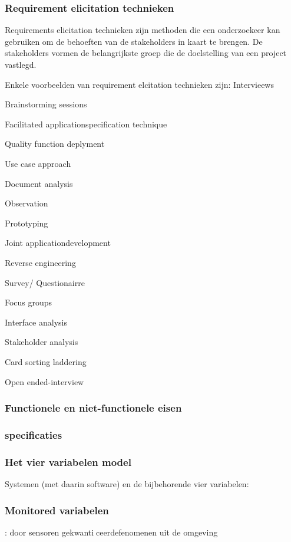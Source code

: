 \subsubsection{Requirement elicitation technieken}

Requirements elicitation technieken zijn methoden die een onderzoekeer kan gebruiken om de behoeften van de stakeholders in kaart te brengen. De stakeholders  vormen de belangrijkste groep die de doelstelling van een project vastlegd.

Enkele voorbeelden van requirement elcitation technieken zijn:
Intervieews 

Brainstorming sessions 

Facilitated applicationspecification technique 

Quality function deplyment 

Use case approach 

Document analysis 

Observation

Prototyping 

Joint applicationdevelopment

Reverse engineering 

Survey/ Questionairre 

Focus groups 

Interface analysis 

Stakeholder analysis 

Card sorting laddering 

Open ended-interview 

\subsubsection{Functionele en niet-functionele eisen}

\subsubsection{specificaties}

\subsubsection{Het vier variabelen model}
Systemen (met daarin software) en de bijbehorende vier variabelen:
\subsubsection{Monitored variabelen}
: door sensoren gekwanticeerdefenomenen uit de omgeving
